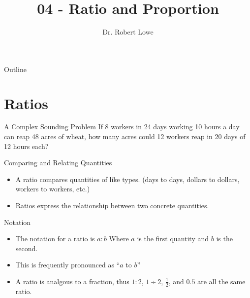 \documentclass[]{beamer}
\title{04 - Ratio and Proportion}
\author{Dr. Robert Lowe\\}
\institute[Maryville College] %
{
  Division of Mathematics and Computer Science\\
  Maryville College
}
\date[]{}
\begin{document}
\begin{frame}
  \titlepage
\end{frame}

\begin{frame}{Outline}
  \tableofcontents
\end{frame}





\section{Ratios}
\begin{frame}{A Complex Sounding Problem}
If 8 workers in 24 days working 10 hours a day can reap 48 acres of
wheat, how many acres could 12 workers reap in 20 days of 12 hours
each?
\end{frame}

\begin{frame}{Comparing and Relating Quantities}
\begin{itemize}[<+->]
    \item A ratio compares quantities of like types. (days to days, dollars to dollars, 
    workers to workers, etc.)
    \item Ratios express the relationship between two concrete quantities.
\end{itemize}
\end{frame}

\begin{frame}{Notation}
\begin{itemize}[<+->]
    \item The notation for a ratio is $a:b$ Where $a$ is the first
        quantity and $b$ is the second.
    \item This is frequently pronounced as ``$a$ to $b$''
    \item A ratio is analgous to a fraction, thus $1:2$, $1\div 2$,
        $\frac{1}{2}$, and $0.5$ are all the same ratio.
\end{itemize}
\end{frame}
\end{document}
